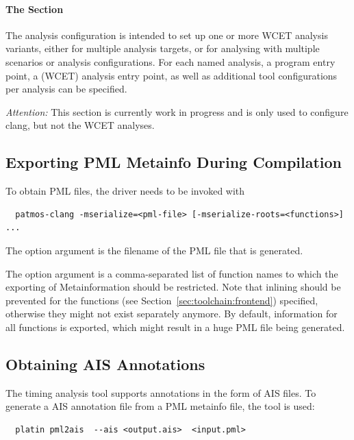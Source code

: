 \paragraph{The  Section}

The analysis configuration is intended to set up one or more WCET analysis variants, either for 
multiple analysis targets, or for analysing with multiple scenarios or analysis configurations.
For each named analysis, a program entry point, a (WCET) analysis entry point, as well as additional tool configurations
per analysis can be specified.

\emph{Attention:} This section is currently work in progress and is only used to configure clang, but not the WCET analyses.


\subsection{Exporting PML Metainfo During Compilation}

To obtain PML files, the  driver needs to be invoked with


\begin{verbatim}
  patmos-clang -mserialize=<pml-file> [-mserialize-roots=<functions>] ...
\end{verbatim}

The option argument  is the filename of the PML file that is
generated.

The option argument  is a comma-separated list of function
names to which the exporting of Metainformation should be restricted.
Note that inlining should be prevented for the functions (see
Section~\ref{sec:toolchain:frontend}) specified, otherwise they might not exist
separately anymore.
By default, information for all functions is exported, which might result
in a huge PML file being generated.


\subsection{Obtaining AIS Annotations}

The  timing analysis tool supports annotations in the form of
AIS files.
To generate a AIS annotation file from a PML metainfo file, the
 tool is used:

\begin{verbatim}
  platin pml2ais  --ais <output.ais>  <input.pml>
\end{verbatim}


